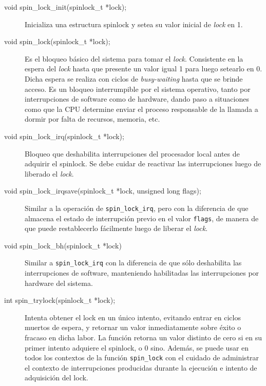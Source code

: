 \begin{description}
\item[void spin\_lock\_init(spinlock\_t *lock);] Inicializa una estructura spinlock y setea su valor inicial de \emph{lock} en 1.
\item[void spin\_lock(spinlock\_t *lock);] Es el bloqueo básico del sistema para tomar el \emph{lock}. Consistente en la espera del \emph{lock} hasta que presente un valor igual 1 para luego setearlo en 0. Dicha espera se realiza con ciclos de \emph{busy-waiting} hasta que se brinde acceso. Es un bloqueo interrumpible por el sistema operativo, tanto por interrupciones de software como de hardware, dando paso a situaciones como que la CPU determine enviar el proceso responsable de la llamada a dormir por falta de recursos, memoria, etc.
\item[void spin\_lock\_irq(spinlock\_t *lock);] Bloqueo que deshabilita interrupciones del procesador local antes de adquirir el spinlock. Se debe cuidar de reactivar las interrupciones luego de liberado el \emph{lock}.
\item[void spin\_lock\_irqsave(spinlock\_t *lock, unsigned long flags);] Similar a la operación de \verb=spin_lock_irq=, pero con la diferencia de que almacena el estado de interrupción previo en el valor \verb=flags=, de manera de que puede restablecerlo fácilmente luego de liberar el \emph{lock}.
\item[void spin\_lock\_bh(spinlock\_t *lock)] Similar a \verb=spin_lock_irq= con la diferencia de que sólo deshabilita las interrupciones de software, manteniendo habilitadas las interrupciones por hardware del sistema.
\item[int spin\_trylock(spinlock\_t *lock);] Intenta obtener el lock en un único intento, evitando entrar en ciclos muertos de espera, y retornar un valor inmediatamente sobre éxito o fracaso en dicha labor. La función retorna un valor distinto de cero si en su primer intento adquiere el spinlock, o 0 sino. Además, se puede usar en todos los contextos de la función \verb=spin_lock= con el cuidado de administrar el contexto de interrupciones producidas durante la ejecución e intento de adquisición del lock.
\end{description}


